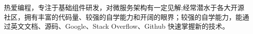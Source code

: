 

\begin{cvparagraph}
  热爱编程，专注于基础组件研发，对微服务架构有一定见解;经常潜水于各大开源社区，拥有丰富的代码量、较强的自学能力和开阔的眼界；较强的自学能力，能通过英文文档、源码、Google、Stack Overflow、Github 快速掌握新的技术。
\end{cvparagraph}
